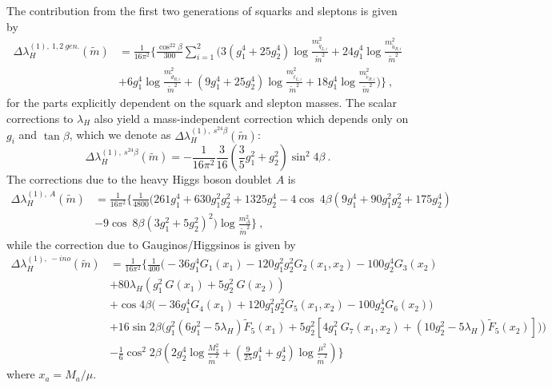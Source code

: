 \documentclass[12pt]{article}
\newcommand{\beq}{\begin{equation}}
\newcommand{\eeq}{\end{equation}}
\newcommand{\sq}{\tilde{q}}
\newcommand{\mSqL}{m_{\sq_{L,i}}}
\newcommand{\mSuR}{m_{\tilde{u}_{R,i}}}
\newcommand{\mSdR}{m_{\tilde{d}_{R,i}}}
\newcommand{\mSeR}{m_{\tilde{e}_{R,i}}}
\newcommand{\mSlL}{m_{\tilde{\ell}_{L,i}}}
\newcommand{\mS}{\tilde{m}}
\begin{document}
The contribution from the first two generations of squarks and sleptons is given by
\begin{align}
\nonumber \Delta\lambda_H^{(1),~1,2~gen.}(\mS) &= \frac{1}{16\pi^2} \Bigg\{ \frac{\cos^22\beta}{300}\sum_{i=1}^2 \Bigg( 3(g_1^4 + 25 g_2^4) \log \frac{\mSqL^2}{\mS^2} + 24 g_1^4 \log \frac{\mSuR^2}{\mS^2} \\ &+ 6 g_1^4 \log\frac{\mSdR^2}{\mS^2} + (9g_1^4 + 25 g_2^4) \log\frac{\mSlL^2}{\mS^2} + 18g_1^4 \log \frac{\mSeR^2}{\mS^2}\Bigg)  \Bigg\} \ ,
\label{OtherGenPart.EQ}
\end{align}
for the parts explicitly dependent on the squark and slepton masses. The scalar corrections to $\lambda_H$ also yield a mass-independent correction which depends only on $g_i$ and $\tan\beta$, which we denote as $\Delta\lambda_H^{(1),~s^24\beta}(\mS)$:
\beq
\Delta\lambda_H^{(1),~s^24\beta}(\mS) = -\frac{1}{16\pi^2}\frac{3}{16}\left( \frac{3}{5}g_1^2 + g_2^2\right)\sin^2 4\beta \ .
\label{SinBeta.EQ}
\eeq
The corrections due to the heavy Higgs boson doublet $A$ is
\begin{align}
\nonumber \Delta\lambda_H^{(1),~A}(\mS) &= \frac{1}{16\pi^2} \Bigg\{ \frac{1}{4800}\Bigg( 261 g_1^4 + 630 g_1^2 g_2^2 + 1325 g_2^4 - 4 \cos~4\beta (9g_1^4 + 90 g_1^2 g_2^2 + 175 g_2^4) \\&- 9 \cos~8\beta(3g_1^2 + 5g_2^2)^2 \Bigg) \log\frac{m_A^2}{\mS^2}\Bigg\} \ ,
\label{mAPart.EQ}
\end{align}
while the correction due to Gauginos/Higgsinos is given by
\begin{align}
\nonumber \Delta\lambda_H^{(1),~-ino}(\mS) &= \frac{1}{16\pi^2} \Bigg\{  \frac{1}{400} \Bigg(-36g_1^4 G_1(x_1) - 120 g_1^2 g_2^2 G_2(x_1, x_2) - 100g_2^4 G_3(x_2) \\ \nonumber &+ 80 \lambda_H( g_1^2 ~G(x_1) + 5 g_2^2 ~G(x_2))  \\ 
\nonumber&+ \cos4\beta \Big( -36g_1^4 G_4(x_1) + 120 g_1^2 g_2^2 G_5(x_1, x_2) -100 g_2^4 G_6(x_2)\Big) \\
\nonumber&+ 16 \sin 2 \beta \Big( g_1^2(6g_1^2 - 5 \lambda_H) \tilde{F}_5(x_1) +5 g_2^2\left[4 g_1^2~G_7(x_1,x_2) + (10 g_2^2 - 5 \lambda_H) \tilde{F}_5(x_2)\right]\Big)
\Bigg) \\ &- \frac{1}{6}\cos^2 2\beta \left( 2 g_2^4 \log \frac{M_2^2}{\mS^2} + \left(\frac{9}{25}g_1^4 + g_2^4\right)\log\frac{\mu^2}{\mS^2}\right) \Bigg\} \ 
\label{Gauginos1L.EQ}
\end{align}
where $x_a = M_a / \mu$.
\end{document}
